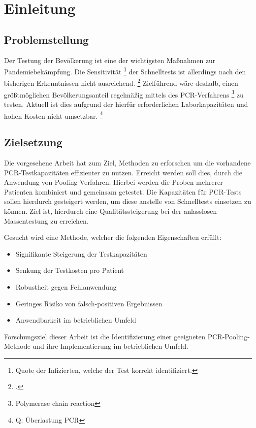 
\chapter{Einleitung}
\section{Problemstellung}
Der Testung der Bevölkerung ist eine der wichtigsten Maßnahmen zur Pandemiebekämpfung.
Die Sensitivität
\footnote{Quote der Infizierten, welche der Test korrekt identifiziert.}
der Schnelltests ist allerdings nach den bisherigen Erkenntnissen nicht ausreichend.
\footcite{Wuerzburg-Studie}
Zielführend wäre deshalb, einen größtmöglichen Bevölkerungsanteil regelmäßig mittels des PCR-Verfahrens
\footnote{\acf{Polymerase chain reaction}}
 zu testen.
Aktuell ist dies aufgrund der hierfür erforderlichen Laborkapazitäten und hohen Kosten nicht umsetzbar.
 \footnote{Q: Überlastung PCR}

\section{Zielsetzung}
Die vorgesehene Arbeit hat zum Ziel, Methoden zu erforschen um die vorhandene PCR-Testkapazitäten effizienter zu nutzen.
Erreicht werden soll dies, durch die Anwendung von Pooling-Verfahren.
Hierbei werden die Proben mehrerer Patienten kombiniert und gemeinsam getestet.
Die Kapazitäten für PCR-Tests sollen hierdurch gesteigert werden, um diese anstelle von Schnelltests einsetzen zu können.
Ziel ist, hierdurch eine Qualitätssteigerung bei der anlasslosen Massentestung zu erreichen.

Gesucht wird eine Methode, welcher die folgenden Eigenschaften erfüllt:

\begin{itemize}
\setlength{\itemsep}{-8pt}
\item Signifikante Steigerung der Testkapazitäten
\item Senkung der Testkosten pro Patient
\item Robustheit gegen Fehlanwendung
\item Geringes Risiko von falsch-positiven Ergebnissen
\item Anwendbarkeit im betrieblichen Umfeld
\end{itemize}

Forschungsziel dieser Arbeit ist die Identifizierung einer geeigneten PCR-Pooling-Methode und ihre Implementierung im betrieblichen Umfeld.
